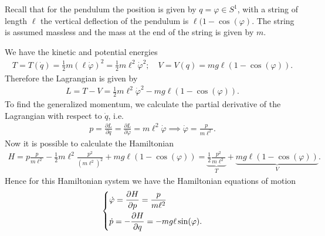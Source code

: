 \begin{ex}
	Recall that for the pendulum the position is given by $q=\varphi\in S^{1}$, with a string of length $\ell$ the vertical deflection of the pendulum is $\ell(1- \cos(\varphi)$. The string is assumed massless and the mass at the end of the string is given by $m$. 
	
	We have the kinetic and potential energies
	\begin{align}
		T = T(\dot{q}) = \frac{1}{2} m (\ell \dot{\varphi})^{2} = \frac{1}{2} m\ell^2 \dot{\varphi}^{2};\quad V = V(q) = mg\ell(1-\cos(\varphi)).
	\end{align}
Therefore the Lagrangian is given by
\begin{align}
	L = T-V = \frac{1}{2}m \ell^2 \dot{\varphi}^{2} - mg\ell(1-\cos(\varphi)).
\end{align}
To find the generalized momentum, we calculate the partial derivative of the Lagrangian with respect to $\dot{q}$, i.e.
\begin{align}
p = \frac{\partial L}{\partial \dot{q}} = \frac{\partial L}{\partial \dot{\varphi}} = m\ell^2 \dot{\varphi}\implies \dot{\varphi} = \frac{p}{m\ell^2}.
\end{align}
Now it is possible to calculate the Hamiltonian
\begin{align}
	H = p \frac{p}{m\ell^2} - \frac{1}{2}m\ell^2 \frac{p^2}{(m\ell^2)^2} + mg\ell(1-\cos(\varphi))
	= \underbrace{\frac{1}{2} \frac{p^2}{m\ell^2}}_{T} + \underbrace{mg\ell(1-\cos(\varphi))}_{V}.
\end{align}
Hence for this Hamiltonian system we have the Hamiltonian equations of motion
\begin{align}
\begin{dcases}
	\dot{\varphi} = \frac{\partial H}{\partial p} = \frac{p}{m\ell^2} \\
	\dot{p} = - \frac{\partial H}{\partial q} = -mg\ell \sin (\varphi).
\end{dcases}
\end{align}
\end{ex}

